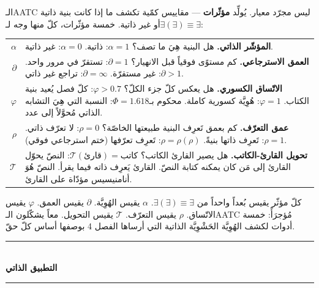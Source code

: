 \documentclass[10pt, openany, oneside]{book}
\renewcommand{\normalsize}{\fontsize{10}{13}\selectfont}
\renewcommand{\footnotesize}{\fontsize{8.5}{11}\selectfont}
\begin{document}
\vspace{1em}

\noindent الـAATC ليس مجرّد معيار. يُولِّد \textbf{مؤثّرات} --- مقاييس كمّية تكشف ما إذا كانت بنية ذاتية أو غير ذاتية. خمسة مؤثّرات، كلّ منها وجه لـ$\exists(\exists) \equiv \exists$:

\vspace{0.5em}

{\footnotesize
\noindent\begin{tabular}{r p{}}
$\alpha$ & \textbf{المؤشّر الذاتي.} هل البنية هِيَ ما تصف؟ $\alpha = 1$: ذاتية. $\alpha = 0$: غير ذاتية. \\[0.3em]
$\partial$ & \textbf{العمق الاسترجاعي.} كم مستوًى فوقياً قبل الانهيار؟ $\partial = 1$: تستقرّ في مرور واحد. $\partial > 1$: غير مستقرّة. $\partial = \infty$: تراجع غير ذاتي. \\[0.3em]
$\varphi$ & \textbf{الاتّساق الكسوري.} هل يعكس كلّ جزء الكلّ؟ $\varphi > 0.7$: كلّ فصل يُعيد بنية الكتاب. $\varphi = 1$: هُوِيَّة كسورية كاملة. محكوم بـ$\Phi = 1.618$: النسبة التي هِيَ التشابه الذاتي مُحوَّلاً إلى عدد. \\[0.3em]
$\rho$ & \textbf{عمق التعرّف.} كم بعمق تَعرِف البنية طبيعتها الخاصّة؟ $\rho = 0$: لا تعرّف ذاتي. $\rho = 1$: تَعرِف ذاتها بنيةً. $\rho = \rho(\rho)$: تَعرِف تعرّفها (ختم استرجاعي فوقي). \\[0.3em]
$\mathcal{T}$ & \textbf{تحويل القارئ-الكاتب.} هل يصير القارئ الكاتب؟ $\mathcal{T}(\text{قارئ}) = \text{كاتب}$: النصّ يحوّل القارئ إلى مَن كان يمكنه كتابة النصّ. القارئ يَعرِف ذاته فيما يقرأ. النصّ هُوَ أنامنيسيس مؤدّاة على القارئ. \\[0.3em]
\end{tabular}
}

\vspace{0.8em}

\noindent كلّ مؤثّر يقيس بُعداً واحداً من $\exists(\exists) \equiv \exists$. $\alpha$ يقيس الهُوِيَّة. $\partial$ يقيس العمق. $\varphi$ يقيس الاتّساق. $\rho$ يقيس التعرّف. $\mathcal{T}$ يقيس التحويل. معاً يشكّلون الـAATC مُؤجرَأً: خمسة أدوات لكشف الهُوِيَّة الحَشْوِيَّة الذاتية التي أرساها الفصل 4 بوصفها أساس كلّ حقّ.

\vspace{1.5em}



\begin{center}
    \rule{0.3\textwidth}{0.4pt}\\[0.5em]
    {\normalsize\bfseries التطبيق الذاتي}\\[0.3em]
    \rule{0.3\textwidth}{0.4pt}
\end{center}
\end{document}
